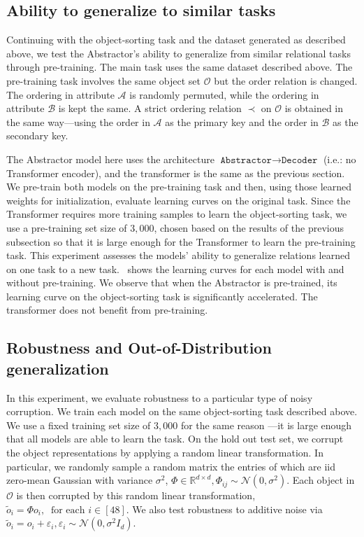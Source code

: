 \subsection{Ability to generalize to similar tasks}

Continuing with the object-sorting task and the dataset generated as described above, we test the Abstractor's ability to generalize from similar relational tasks through pre-training. The main task uses the same dataset described above. The pre-training task involves the same object set $\mathcal{O}$ but the order relation is changed. The ordering in attribute $\mathcal{A}$ is randomly permuted, while the ordering in attribute $\mathcal{B}$ is kept the same. A strict ordering relation $\prec$ on $\mathcal{O}$ is obtained in the same way---using the order in $\mathcal{A}$ as the primary key and the order in $\mathcal{B}$ as the secondary key.

The Abstractor model here uses the architecture $\texttt{Abstractor} \to \texttt{Decoder}$ (i.e.: no Transformer
encoder), and the transformer is the same as the previous section. We pre-train both models on the pre-training task
and then, using those learned weights for initialization, evaluate learning curves on the original task. Since the
Transformer requires more training samples to learn the object-sorting task, we use a pre-training set size of $3,000$, chosen based on the results of the previous subsection so that it is large enough for the Transformer to learn the pre-training task. This experiment assesses the models' ability to generalize relations learned on one task to a new task.~ shows the learning curves for each model with and without pre-training. We observe that when the Abstractor is pre-trained, its learning curve on the object-sorting task is significantly accelerated. The transformer does not benefit from pre-training.

\subsection{Robustness and Out-of-Distribution generalization}
In this experiment, we evaluate robustness to a particular type of noisy corruption. We train each model on the same
object-sorting task described above. We use a fixed training set size of $3,000$ for the same reason
---it is large enough that all models are able to learn the task. On the hold out test set, we corrupt the object
representations by applying a random linear transformation. In particular, we randomly sample a random matrix the
entries of which are iid zero-mean Gaussian with variance $\sigma^2$, $\Phi \in \mathbb{R}^{d \times d}, \Phi_{ij} \sim \mathcal{N}(0, \sigma^2)$. Each object in $\mathcal{O}$ is then corrupted by this random linear transformation,
$\tilde{o}_i = \Phi o_i, \ \text{ for each } i \in [48]$. We also test robustness to additive noise via $\tilde{o}_i = o_i + \varepsilon_i, \varepsilon_i \sim \mathcal{N}(0, \sigma^2 I_d)$.

